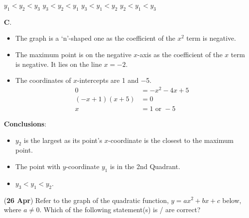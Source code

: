 \documentclass[12pt, answers]{exam} %
\begin{document}
\begin{questions}
	\begin{oneparchoices}
		\choice \(y_{1} < y_{2} < y_{3}\)
		\choice \(y_{3} < y_{2} < y_{1}\)
		\choice \(y_{3} < y_{1} < y_{2}\)
		\choice \(y_{2} < y_{1} < y_{3}\)
	\end{oneparchoices}
	\begin{solution}
		\textbf{C}.
		\begin{itemize}
			\item The graph is a `n'-shaped one as the coefficient of the \(x^{2}\) term is negative.
			\item The maximum point is on the negative \(x\)-axis as the coefficient of the \(x\) term is negative. It lies on the line \(x = -2\).
			\item The coordinates of \(x\)-intercepts are \num{1} and \num{-5}.
			      \begin{align*}
				      0               & = -x^{2} - 4x + 5  \\
				      (-x + 1)(x + 5) & = 0                \\
				      x               & = 1 \text{ or } -5
			      \end{align*}
		\end{itemize}
		\textbf{Conclusions}:
		\begin{itemize}
			\item \(y_{2}\) is the largest as its point's \(x\)-coordinate is the closest to the maximum point.
			\item The point with \(y\)-coordinate \(y_{1}\) is in the 2nd Quadrant.
			\item \(y_{3} < y_{1} < y_{2}\).
		\end{itemize}
	\end{solution}

	\question (\textbf{26 Apr}) Refer to the graph of the quadratic function, \(y = ax^2 + bx + c \) below,
	where \(a \neq 0\). Which of the following statement(s) is / are correct?
	\begin{figure}[htpb]
		\centering
	\end{figure}


\end{questions}
\end{document}

